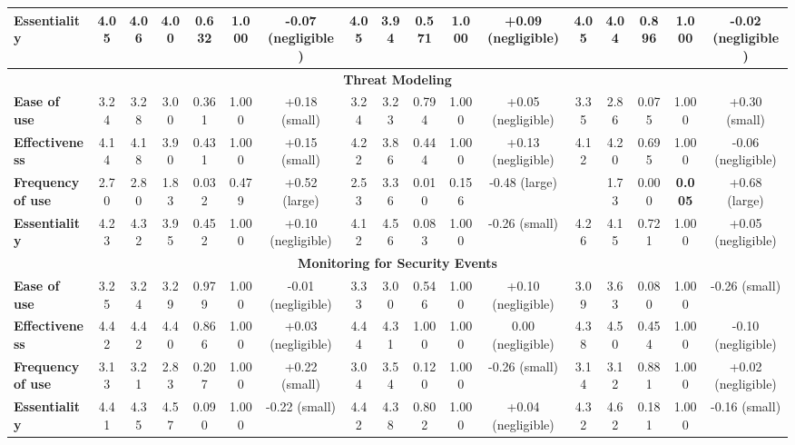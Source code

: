 \begin{tiny}
\begin{longtable}{@{}lcccccccccccccccc@{}}
\textbf{Essentiality} & 4.05 & 4.06 & 4.00 & 0.632 & 1.000 & \multicolumn{1}{c|}{-0.07 (negligible)} & 4.05 & 3.94 & 0.571 & 1.000 & \multicolumn{1}{c|}{+0.09 (negligible)} & 4.05 & 4.04 & 0.896 & 1.000 & -0.02 (negligible) \\ \midrule
\multicolumn{17}{c}{\textbf{Threat Modeling}} \\ \midrule
\textbf{Ease of use} & 3.24 & 3.28 & 3.00 & 0.361 & 1.000 & \multicolumn{1}{c|}{+0.18 (small)} & 3.24 & 3.23 & 0.794 & 1.000 & \multicolumn{1}{c|}{+0.05 (negligible)} & 3.35 & 2.86 & 0.075 & 1.000 & +0.30 (small) \\ \midrule
\textbf{Effectiveness} & 4.14 & 4.18 & 3.90 & 0.431 & 1.000 & \multicolumn{1}{c|}{+0.15 (small)} & 4.22 & 3.86 & 0.444 & 1.000 & \multicolumn{1}{c|}{+0.13 (negligible)} & 4.12 & 4.20 & 0.695 & 1.000 & -0.06 (negligible) \\ \midrule
\textbf{Frequency of use} & 2.70 & 2.80 & 1.83 & 0.032 & 0.479 & \multicolumn{1}{c|}{+0.52 (large)} & 2.53 & 3.36 & 0.010 & 0.156 & \multicolumn{1}{c|}{-0.48 (large)} & \cellcolor[HTML]{D9D9D9}{2.93} & 1.73 & 0.000 & \textbf{0.005} & +0.68 (large) \\ \midrule
\textbf{Essentiality} & 4.23 & 4.32 & 3.95 & 0.452 & 1.000 & \multicolumn{1}{c|}{+0.10 (negligible)} & 4.12 & 4.56 & 0.083 & 1.000 & \multicolumn{1}{c|}{-0.26 (small)} & 4.26 & 4.15 & 0.721 & 1.000 & +0.05 (negligible) \\ \midrule
\multicolumn{17}{c}{\textbf{Monitoring for Security Events}} \\ \midrule
\textbf{Ease of use} & 3.25 & 3.24 & 3.29 & 0.979 & 1.000 & \multicolumn{1}{c|}{-0.01 (negligible)} & 3.33 & 3.00 & 0.546 & 1.000 & \multicolumn{1}{c|}{+0.10 (negligible)} & 3.09 & 3.63 & 0.080 & 1.000 & -0.26 (small) \\ \midrule
\textbf{Effectiveness} & 4.42 & 4.42 & 4.40 & 0.866 & 1.000 & \multicolumn{1}{c|}{+0.03 (negligible)} & 4.44 & 4.31 & 1.000 & 1.000 & \multicolumn{1}{c|}{0.00 (negligible)} & 4.38 & 4.50 & 0.454 & 1.000 & -0.10 (negligible) \\ \midrule
\textbf{Frequency of use} & 3.13 & 3.21 & 2.83 & 0.207 & 1.000 & \multicolumn{1}{c|}{+0.22 (small)} & 3.04 & 3.54 & 0.120 & 1.000 & \multicolumn{1}{c|}{-0.26 (small)} & 3.14 & 3.12 & 0.881 & 1.000 & +0.02 (negligible) \\ \midrule
\textbf{Essentiality} & 4.41 & 4.35 & 4.57 & 0.090 & 1.000 & \multicolumn{1}{c|}{-0.22 (small)} & 4.42 & 4.38 & 0.802 & 1.000 & \multicolumn{1}{c|}{+0.04 (negligible)} & 4.32 & 4.62 & 0.181 & 1.000 & -0.16 (small) \\ \midrule

\end{longtable}
\end{tiny}
